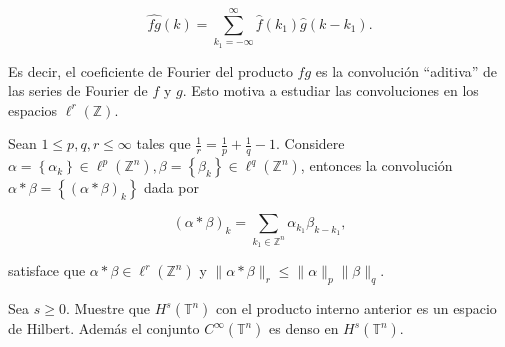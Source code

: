 \documentclass[12pt]{article}
\newcommand\T{\mathbb{T}}
\begin{document}
$$
\widehat{f g}(k)=\sum_{k_1=-\infty}^{\infty} \widehat{f}\left(k_1\right) \widehat{g}\left(k-k_1\right).
$$


Es decir, el coeficiente de Fourier del producto $f g$ es la convolución ``aditiva'' de las series de Fourier de $f$ y $g$. Esto motiva a estudiar las convoluciones en los espacios $\ell^r(\mathbb{Z})$.

\begin{theorem}
Sean $1 \leq p, q, r \leq \infty$ tales que $\frac{1}{r}=\frac{1}{p}+\frac{1}{q}-1$. Considere $\alpha=\left\{\alpha_k\right\} \in \ell^p\left(\mathbb{Z}^n\right), \beta=\left\{\beta_k\right\} \in \ell^q\left(\mathbb{Z}^n\right)$, entonces la convolución $\alpha * \beta=\left\{(\alpha * \beta)_k\right\}$ dada por

$$
(\alpha * \beta)_k=\sum_{k_1 \in \mathbb{Z}^n} \alpha_{k_1} \beta_{k-k_1},
$$

satisface que $\alpha * \beta \in \ell^r\left(\mathbb{Z}^n\right)$ y $\|\alpha * \beta\|_r \leq\|\alpha\|_{p}\|\beta\|_{q}$.

\end{theorem}


\begin{theorem}
Sea $s \geq 0$. Muestre que $H^s\left(\mathbb{T}^n\right)$ con el producto interno anterior es un espacio de Hilbert. Además el conjunto $C^{\infty}(\T^n)$ es denso en $H^s(\T^n)$.
\end{theorem}
\end{document}
